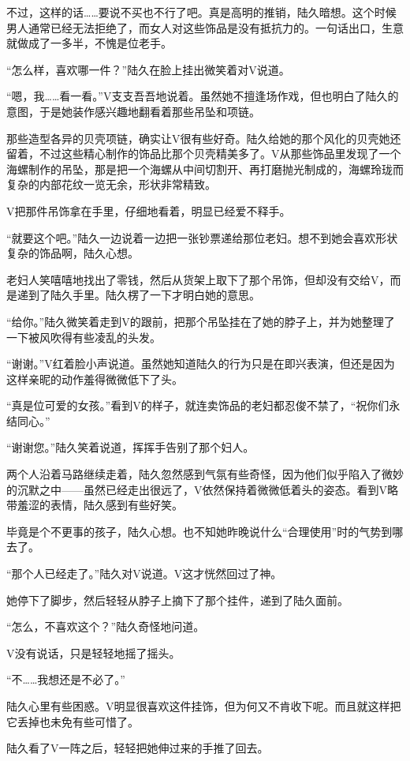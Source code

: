 不过，这样的话……要说不买也不行了吧。真是高明的推销，陆久暗想。这个时候男人通常已经无法拒绝了，而女人对这些饰品是没有抵抗力的。一句话出口，生意就做成了一多半，不愧是位老手。

“怎么样，喜欢哪一件？”陆久在脸上挂出微笑着对V说道。

“嗯，我……看一看。”V支支吾吾地说着。虽然她不擅逢场作戏，但也明白了陆久的意图，于是她装作感兴趣地翻看着那些吊坠和项链。

那些造型各异的贝壳项链，确实让V很有些好奇。陆久给她的那个风化的贝壳她还留着，不过这些精心制作的饰品比那个贝壳精美多了。V从那些饰品里发现了一个海螺制作的吊坠，那是把一个海螺从中间切割开、再打磨抛光制成的，海螺玲珑而复杂的内部花纹一览无余，形状非常精致。

V把那件吊饰拿在手里，仔细地看着，明显已经爱不释手。

“就要这个吧。”陆久一边说着一边把一张钞票递给那位老妇。想不到她会喜欢形状复杂的饰品啊，陆久心想。

老妇人笑嘻嘻地找出了零钱，然后从货架上取下了那个吊饰，但却没有交给V，而是递到了陆久手里。陆久楞了一下才明白她的意思。

“给你。”陆久微笑着走到V的跟前，把那个吊坠挂在了她的脖子上，并为她整理了一下被风吹得有些凌乱的头发。

“谢谢。”V红着脸小声说道。虽然她知道陆久的行为只是在即兴表演，但还是因为这样亲昵的动作羞得微微低下了头。

“真是位可爱的女孩。”看到V的样子，就连卖饰品的老妇都忍俊不禁了，“祝你们永结同心。”

“谢谢您。”陆久笑着说道，挥挥手告别了那个妇人。

两个人沿着马路继续走着，陆久忽然感到气氛有些奇怪，因为他们似乎陷入了微妙的沉默之中——虽然已经走出很远了，V依然保持着微微低着头的姿态。看到V略带羞涩的表情，陆久感到有些好笑。

毕竟是个不更事的孩子，陆久心想。也不知她昨晚说什么“合理使用”时的气势到哪去了。

“那个人已经走了。”陆久对V说道。V这才恍然回过了神。

她停下了脚步，然后轻轻从脖子上摘下了那个挂件，递到了陆久面前。

“怎么，不喜欢这个？”陆久奇怪地问道。

V没有说话，只是轻轻地摇了摇头。

“不……我想还是不必了。”

陆久心里有些困惑。V明显很喜欢这件挂饰，但为何又不肯收下呢。而且就这样把它丢掉也未免有些可惜了。

陆久看了V一阵之后，轻轻把她伸过来的手推了回去。


